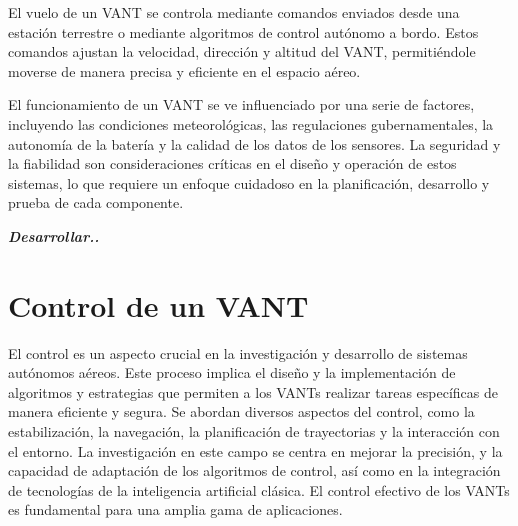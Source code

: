 
El vuelo de un VANT se controla mediante comandos enviados desde una estación terrestre o mediante algoritmos de control autónomo a bordo. Estos comandos ajustan la velocidad, dirección y altitud del VANT, permitiéndole moverse de manera precisa y eficiente en el espacio aéreo.

El funcionamiento de un VANT se ve influenciado por una serie de factores, incluyendo las condiciones meteorológicas, las regulaciones gubernamentales, la autonomía de la batería y la calidad de los datos de los sensores. La seguridad y la fiabilidad son consideraciones críticas en el diseño y operación de estos sistemas, lo que requiere un enfoque cuidadoso en la planificación, desarrollo y prueba de cada componente.

\textit{\textbf{Desarrollar..}}


\section{Control de un VANT}

El control es un aspecto crucial en la investigación y desarrollo de sistemas autónomos aéreos. Este proceso implica el diseño y la implementación de algoritmos y estrategias que permiten a los VANTs realizar tareas específicas de manera eficiente y segura. Se abordan diversos aspectos del control, como la estabilización, la navegación, la planificación de trayectorias y la interacción con el entorno. La investigación en este campo se centra en mejorar la precisión, y la capacidad de adaptación de los algoritmos de control, así como en la integración de tecnologías de la inteligencia artificial clásica. El control efectivo de los VANTs es fundamental para una amplia gama de aplicaciones.


